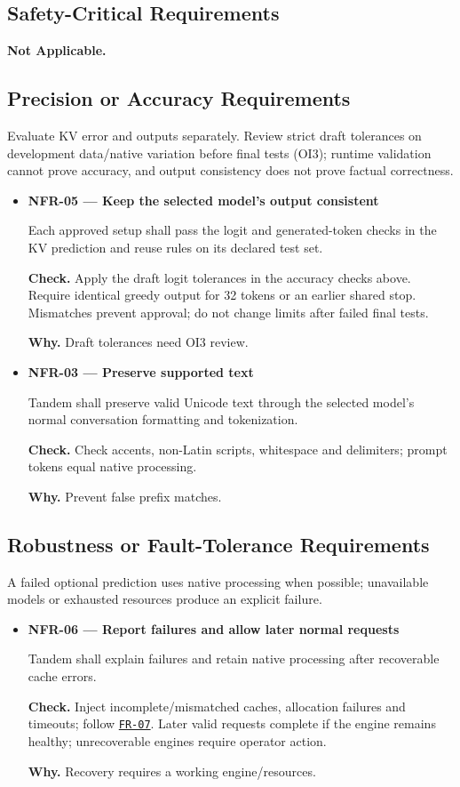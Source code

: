 \documentclass[12pt]{article}
\begin{document}
\subsection{Safety-Critical Requirements}
\textbf{Not Applicable.}


\subsection{Precision or Accuracy Requirements}
Evaluate KV error and outputs separately. Review strict draft tolerances on
development data/native variation before final tests (OI3); runtime validation
cannot prove accuracy, and output consistency does not prove factual correctness.

\begin{itemize}
\item {}\label{req:NFR-05}
\textbf{NFR-05 --- Keep the selected model's output consistent}\par
Each approved setup shall pass the logit and generated-token checks in the KV prediction and reuse rules on its declared test set.\par
\textbf{Check.} Apply the draft logit tolerances in the accuracy checks above. Require identical greedy output for 32 tokens or an earlier shared stop. Mismatches prevent approval; do not change limits after failed final tests.\par
\textbf{Why.} Draft tolerances need OI3 review.


\item {}\label{req:NFR-03}
\textbf{NFR-03 --- Preserve supported text}\par
Tandem shall preserve valid Unicode text through the selected model's normal conversation formatting and tokenization.\par
\textbf{Check.} Check accents, non-Latin scripts, whitespace and delimiters; prompt tokens equal native processing.\par
\textbf{Why.} Prevent false prefix matches.
\end{itemize}


\subsection{Robustness or Fault-Tolerance Requirements}
A failed optional prediction uses native processing when possible; unavailable models or exhausted resources produce an explicit failure.

\begin{itemize}
\item {}\label{req:NFR-06}
\textbf{NFR-06 --- Report failures and allow later normal requests}\par
Tandem shall explain failures and retain native processing after recoverable cache errors.\par
\textbf{Check.} Inject incomplete/mismatched caches, allocation failures and timeouts; follow \hyperref[req:FR-07]{\texttt{FR-07}}. Later valid requests complete if the engine remains healthy; unrecoverable engines require operator action.\par
\textbf{Why.} Recovery requires a working engine/resources.
\end{itemize}
\end{document}

